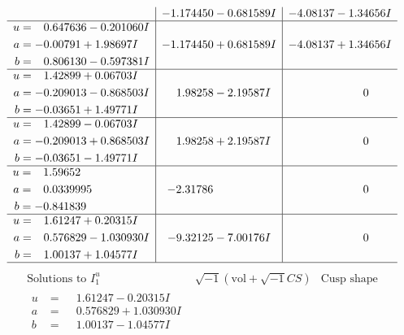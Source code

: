 \documentclass[1p]{elsarticle_modified}
\theoremstyle{definition}
\newcommand{\I}{\sqrt{-1}}
\begin{document}
$$\begin{array}{c|c|c}
 & -1.174450 - 0.681589 I & -4.08137 - 1.34656 I \\ \hline\begin{aligned}
u &= \phantom{-}0.647636 - 0.201060 I \\
a &= -0.00791 + 1.98697 I \\
b &= \phantom{-}0.806130 - 0.597381 I\end{aligned}
 & -1.174450 + 0.681589 I & -4.08137 + 1.34656 I \\ \hline\begin{aligned}
u &= \phantom{-}1.42899 + 0.06703 I \\
a &= -0.209013 - 0.868503 I \\
b &= -0.03651 + 1.49771 I\end{aligned}
 & \phantom{-}1.98258 - 2.19587 I & \phantom{-0.000000 } 0 \\ \hline\begin{aligned}
u &= \phantom{-}1.42899 - 0.06703 I \\
a &= -0.209013 + 0.868503 I \\
b &= -0.03651 - 1.49771 I\end{aligned}
 & \phantom{-}1.98258 + 2.19587 I & \phantom{-0.000000 } 0 \\ \hline\begin{aligned}
u &= \phantom{-}1.59652\phantom{ +0.000000I} \\
a &= \phantom{-}0.0339995\phantom{ +0.000000I} \\
b &= -0.841839\phantom{ +0.000000I}\end{aligned}
 & -2.31786\phantom{ +0.000000I} & \phantom{-0.000000 } 0 \\ \hline\begin{aligned}
u &= \phantom{-}1.61247 + 0.20315 I \\
a &= \phantom{-}0.576829 - 1.030930 I \\
b &= \phantom{-}1.00137 + 1.04577 I\end{aligned}
 & -9.32125 - 7.00176 I & \phantom{-0.000000 } 0\\
 \hline 
 \end{array}$$\newpage$$\begin{array}{c|c|c}  
\text{Solutions to }I^u_{1}& \I (\text{vol} + \sqrt{-1}CS) & \text{Cusp shape}\\
 \hline 
\begin{aligned}
u &= \phantom{-}1.61247 - 0.20315 I \\
a &= \phantom{-}0.576829 + 1.030930 I \\
b &= \phantom{-}1.00137 - 1.04577 I\end{aligned}

\end{array}$$
\end{document}
